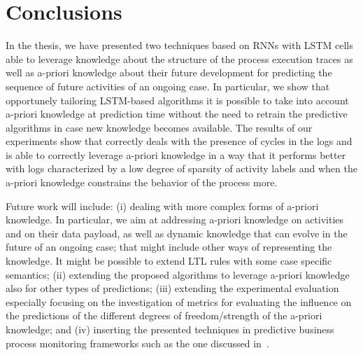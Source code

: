 
\section{Conclusions} %
\label{sec:conclusions}

In the thesis, we have presented two techniques based on RNNs with LSTM cells able to leverage knowledge about the structure of the process execution traces as well as a-priori knowledge about their future development for predicting the sequence of future activities of an ongoing case. In particular, we show that opportunely tailoring LSTM-based algorithms it is possible to take into account a-priori knowledge at prediction time without the need to retrain the predictive algorithms in case new knowledge becomes available. The results of our experiments show that \nocycle correctly deals with the presence of cycles in the logs and \protrack is able to correctly leverage a-priori knowledge in a way that it performs better with logs characterized by a low degree of sparsity of activity labels and when the a-priori knowledge constrains the behavior of the process more.

Future work will include: (i) dealing with more complex forms of a-priori knowledge. In particular, we aim at addressing a-priori knowledge on activities and on their data payload, as well as dynamic knowledge that can evolve in the future of an ongoing case; that might include other ways of representing the knowledge. It might be possible to extend LTL rules with some case specific semantics;  (ii) extending the proposed algorithms to leverage a-priori knowledge also for other types of predictions; (iii) extending the experimental evaluation especially focusing on the investigation of metrics for evaluating the influence on the predictions of the different degrees of freedom/strength of the a-priori knowledge; and (iv) inserting the presented techniques in predictive business process monitoring frameworks such as the one discussed in~\cite{Di-Francescomarino:2016aa}. 

\newpage

